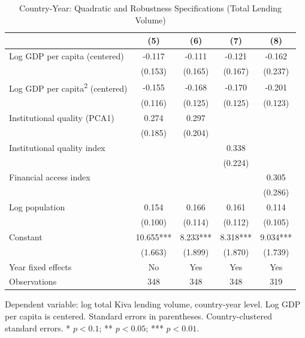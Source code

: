 \begin{table}[htbp]
\centering
\caption{Country-Year: Quadratic and Robustness Specifications (Total Lending Volume)}
\label{tab:table4}
\begin{tabular}{lcccc}
\toprule
 & (5) & (6) & (7) & (8) \\
\midrule
Log GDP per capita (centered) & -0.117 & -0.111 & -0.121 & -0.162 \\
 & (0.153) & (0.165) & (0.167) & (0.237) \\
Log GDP per capita\textsuperscript{2} (centered) & -0.155 & -0.168 & -0.170 & -0.201 \\
 & (0.116) & (0.125) & (0.125) & (0.123) \\
Institutional quality (PCA1) & 0.274 & 0.297 &  &  \\
 & (0.185) & (0.204) &  &  \\
Institutional quality index &  &  & 0.338 &  \\
 &  &  & (0.224) &  \\
Financial access index &  &  &  & 0.305 \\
 &  &  &  & (0.286) \\
Log population & 0.154 & 0.166 & 0.161 & 0.114 \\
 & (0.100) & (0.114) & (0.112) & (0.105) \\
Constant & 10.655*** & 8.233*** & 8.318*** & 9.034*** \\
 & (1.663) & (1.899) & (1.870) & (1.739) \\
\midrule
Year fixed effects & No & Yes & Yes & Yes \\
Observations & 348 & 348 & 348 & 319 \\
\bottomrule
\end{tabular}
\par\smallskip\footnotesize Dependent variable: log total Kiva lending volume, country-year level. Log GDP per capita is centered. Standard errors in parentheses. Country-clustered standard errors. * $p<0.1$; ** $p<0.05$; *** $p<0.01$.
\end{table}